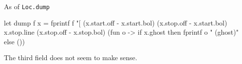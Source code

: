 As of \verb|Loc.dump|

\begin{ocamlcode}
  let dump f x =
  fprintf f "[%
    (x.start.off - x.start.bol) (x.stop.off - x.start.bol) x.stop.line
    (x.stop.off - x.stop.bol)
    (fun o -> if x.ghost then fprintf o " (ghost)" else ())
\end{ocamlcode}

The third field does not seem to make sense.